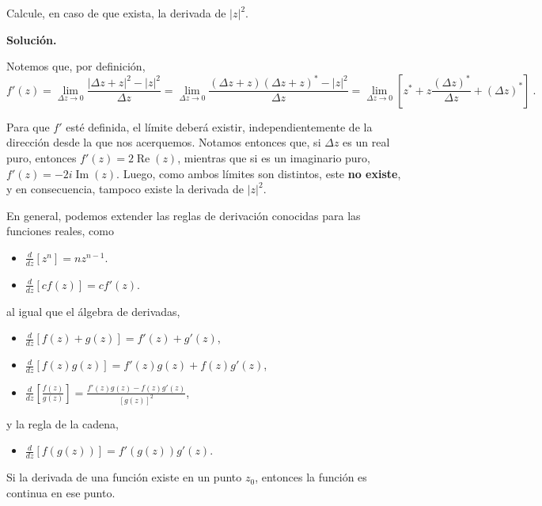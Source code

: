 \begin{ejemplo}
    Calcule, en caso de que exista, la derivada de $|z|^2$.

    \noindent \textbf{Solución.}

    \noindent Notemos que, por definición,
    \begin{equation*}
        f'(z) = \lim_{\Delta z \to 0} \frac{|\Delta z + z|^2 - |z|^2}{\Delta z} = \lim_{\Delta z \to 0} \frac{(\Delta z + z)(\Delta z + z)^\ast - |z|^2}{\Delta z} = \lim_{\Delta z \to 0} \left[ z^\ast + z \frac{(\Delta z)^\ast}{\Delta z} + (\Delta z)^\ast \right] \ .
    \end{equation*}

    Para que $f'$ esté definida, el límite deberá existir, independientemente de la dirección desde la que nos acerquemos. Notamos entonces que, si $\Delta z$ es un real puro, entonces $f'(z) = 2 \operatorname{Re}(z)$, mientras que si es un imaginario puro, $f'(z) = -2i \operatorname{Im}(z)$. Luego, como ambos límites son distintos, este \textbf{no existe}, y en consecuencia, tampoco existe la derivada de $|z|^2$.
\end{ejemplo}

En general, podemos extender las reglas de derivación conocidas para las funciones reales, como 
\begin{itemize}
    \item $\displaystyle \frac{d}{dz}[z^n] = n z^{n-1}$.
    \item $\displaystyle \frac{d}{dz}[c f(z)] = c f'(z)$.
\end{itemize}
al igual que el álgebra de derivadas,
\begin{itemize}
    \item $\displaystyle \frac{d}{dz}[f(z) + g(z)] = f'(z) + g'(z)$,
    \item $\displaystyle \frac{d}{dz}[f(z) g(z)] = f'(z) g(z) + f(z) g'(z)$,
    \item $\displaystyle \frac{d}{dz} \left[ \frac{f(z)}{g(z)} \right] = \frac{f'(z)g(z) - f(z)g'(z)}{[g(z)]^2}$,
\end{itemize}
y la regla de la cadena,
\begin{itemize}
    \item $\displaystyle \frac{d}{dz}[f(g(z))] = f'(g(z)) g'(z)$.
\end{itemize}

\begin{teorema}
    Si la derivada de una función existe en un punto $z_0$, entonces la función es continua en ese punto.
\end{teorema}

